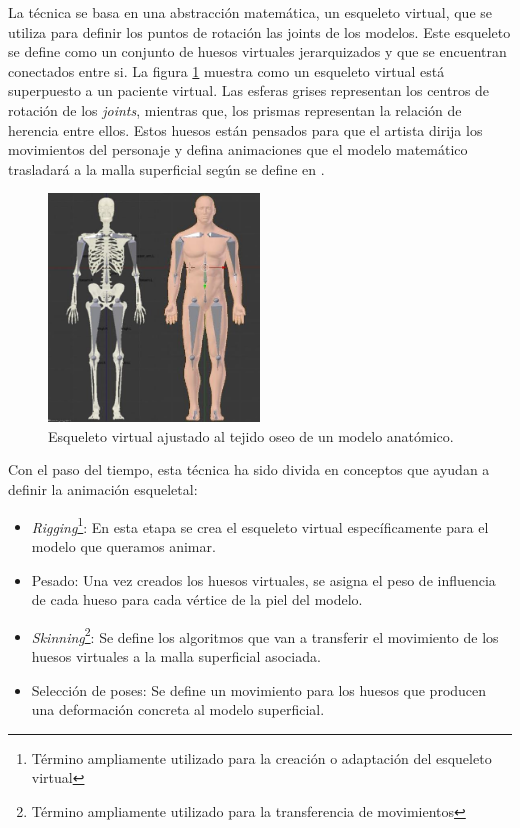 La técnica se basa en una abstracción matemática, un esqueleto virtual, que se utiliza para definir los puntos de rotación las \ac{joints} de los modelos. Este esqueleto se define como un conjunto de huesos virtuales jerarquizados y que se encuentran conectados entre si. La figura \ref{fig:virtualskeleton} muestra como un esqueleto virtual está superpuesto a un paciente virtual. Las esferas grises representan los centros de rotación de los \emph{\ac{joints}}, mientras que, los prismas representan la relación de herencia entre ellos. Estos huesos están pensados para que el artista dirija los movimientos del personaje y defina animaciones que el modelo matemático trasladará a la malla superficial según se define en \cite{thalmann88}. 

\begin{figure}[h]
   \centering
    \includegraphics[width=0.5\textwidth]{IMG/virtualskeleton.png}
    \caption{Esqueleto virtual ajustado al tejido oseo de un modelo anatómico.}
   \label{fig:virtualskeleton}
\end{figure}

Con el paso del tiempo, esta técnica ha sido divida en conceptos que ayudan a definir la animación esqueletal:

\begin{itemize}
    \item \emph{Rigging}\footnote{Término ampliamente utilizado para la creación o adaptación del esqueleto virtual}: En esta etapa se crea el esqueleto virtual específicamente para el modelo que queramos animar.
    \item Pesado: Una vez creados los huesos virtuales, se asigna el peso de influencia de cada hueso para cada vértice de la piel del modelo.
    \item \emph{Skinning}\footnote{Término ampliamente utilizado  para la transferencia de movimientos}: Se define los algoritmos que van a transferir el movimiento de los huesos virtuales a la malla superficial asociada. 
    \item Selección de poses: Se define un movimiento para los huesos que producen una deformación concreta al modelo superficial.
\end{itemize}

